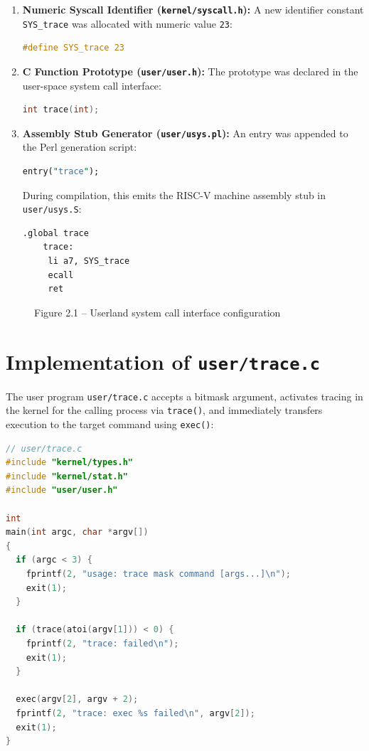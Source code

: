 \documentclass[12pt,a4paper]{report}
\numberwithin{equation}{chapter}
\numberwithin{figure}{chapter}
\numberwithin{table}{chapter}
\begin{document}
\begin{enumerate}
    \item \textbf{Numeric Syscall Identifier (\texttt{kernel/syscall.h}):}
    A new identifier constant \texttt{SYS\_trace} was allocated with numeric value \texttt{23}:
    \begin{lstlisting}[language=C]
    #define SYS_trace 23
    \end{lstlisting}

    \item \textbf{C Function Prototype (\texttt{user/user.h}):}
    The prototype was declared in the user-space system call interface:
    \begin{lstlisting}[language=C]
    int trace(int);
    \end{lstlisting}

    \item \textbf{Assembly Stub Generator (\texttt{user/usys.pl}):}
    An entry was appended to the Perl generation script:
    \begin{lstlisting}[language=Perl]
    entry("trace");
    \end{lstlisting}
    During compilation, this emits the RISC-V machine assembly stub in \texttt{user/usys.S}:
    \begin{lstlisting}[language={[x86masm]Assembler}]
    .global trace
    trace:
     li a7, SYS_trace
     ecall
     ret
    \end{lstlisting}
\end{enumerate}

\begin{figure}[H]
\centering
\caption{Figure 2.1 -- Userland system call interface configuration}
\end{figure}

\section{Implementation of \texttt{user/trace.c}}
The user program \texttt{user/trace.c} accepts a bitmask argument, activates tracing in the kernel for the calling process via \texttt{trace()}, and immediately transfers execution to the target command using \texttt{exec()}:

\begin{lstlisting}[language=C]
// user/trace.c
#include "kernel/types.h"
#include "kernel/stat.h"
#include "user/user.h"

int
main(int argc, char *argv[])
{
  if (argc < 3) {
    fprintf(2, "usage: trace mask command [args...]\n");
    exit(1);
  }

  if (trace(atoi(argv[1])) < 0) {
    fprintf(2, "trace: failed\n");
    exit(1);
  }

  exec(argv[2], argv + 2);
  fprintf(2, "trace: exec %s failed\n", argv[2]);
  exit(1);
}
\end{lstlisting}
\end{document}
